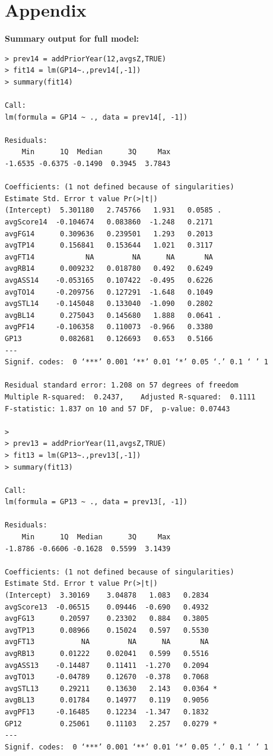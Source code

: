 \documentclass[]{scrartcl}
\begin{document}
\section*{Appendix}
{\textbf{Summary output for full model:}}
\footnotesize
\begin{verbatim}
> prev14 = addPriorYear(12,avgsZ,TRUE)
> fit14 = lm(GP14~.,prev14[,-1])
> summary(fit14)

Call:
lm(formula = GP14 ~ ., data = prev14[, -1])

Residuals:
    Min      1Q  Median      3Q     Max 
-1.6535 -0.6375 -0.1490  0.3945  3.7843 

Coefficients: (1 not defined because of singularities)
Estimate Std. Error t value Pr(>|t|)  
(Intercept)  5.301180   2.745766   1.931   0.0585 .
avgScore14  -0.104674   0.083860  -1.248   0.2171  
avgFG14      0.309636   0.239501   1.293   0.2013  
avgTP14      0.156841   0.153644   1.021   0.3117  
avgFT14            NA         NA      NA       NA  
avgRB14      0.009232   0.018780   0.492   0.6249  
avgASS14    -0.053165   0.107422  -0.495   0.6226  
avgTO14     -0.209756   0.127291  -1.648   0.1049  
avgSTL14    -0.145048   0.133040  -1.090   0.2802  
avgBL14      0.275043   0.145680   1.888   0.0641 .
avgPF14     -0.106358   0.110073  -0.966   0.3380  
GP13         0.082681   0.126693   0.653   0.5166  
---
Signif. codes:  0 ‘***’ 0.001 ‘**’ 0.01 ‘*’ 0.05 ‘.’ 0.1 ‘ ’ 1

Residual standard error: 1.208 on 57 degrees of freedom
Multiple R-squared:  0.2437,	Adjusted R-squared:  0.1111 
F-statistic: 1.837 on 10 and 57 DF,  p-value: 0.07443

> 
> prev13 = addPriorYear(11,avgsZ,TRUE)
> fit13 = lm(GP13~.,prev13[,-1])
> summary(fit13)

Call:
lm(formula = GP13 ~ ., data = prev13[, -1])

Residuals:
    Min      1Q  Median      3Q     Max 
-1.8786 -0.6606 -0.1628  0.5599  3.1439 

Coefficients: (1 not defined because of singularities)
Estimate Std. Error t value Pr(>|t|)  
(Intercept)  3.30169    3.04878   1.083   0.2834  
avgScore13  -0.06515    0.09446  -0.690   0.4932  
avgFG13      0.20597    0.23302   0.884   0.3805  
avgTP13      0.08966    0.15024   0.597   0.5530  
avgFT13           NA         NA      NA       NA  
avgRB13      0.01222    0.02041   0.599   0.5516  
avgASS13    -0.14487    0.11411  -1.270   0.2094  
avgTO13     -0.04789    0.12670  -0.378   0.7068  
avgSTL13     0.29211    0.13630   2.143   0.0364 *
avgBL13      0.01784    0.14977   0.119   0.9056  
avgPF13     -0.16485    0.12234  -1.347   0.1832  
GP12         0.25061    0.11103   2.257   0.0279 *
---
Signif. codes:  0 ‘***’ 0.001 ‘**’ 0.01 ‘*’ 0.05 ‘.’ 0.1 ‘ ’ 1


\end{verbatim}
\end{document}
